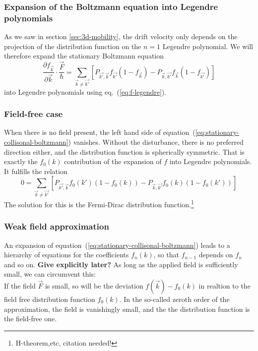 \documentclass[physics,phd,nolot,nolof]{uccthesis}%
\newcommand{\alert}[1]{\textbf{\color{red}#1}}
\begin{document}
{\subsubsection{Expansion of the Boltzmann equation into Legendre polynomials}
As we saw in section \ref{sec:3d-mobility}, the drift velocity only depends on 
the projection of the distribution function on the $n=1$ Legendre polynomial.
We will therefore expand the stationary Boltzmann equation
\begin{equation}
  \frac{\partial f_{\vec k}}{\partial \vec k} \cdot \frac{\vec F}{\hbar}
  =\sum\limits_{\vec{k}\neq\vec{k'}}
  \left[P_{\vec{ k'},\vec{k}}f_{\vec{k'}}(1-f_{\vec{k}})-P_{\vec k,\vec{k'}}f_{\vec k}(1-f_{\vec{k'}})\right]
  \label{eq:stationary-collisonal-boltzmann}
\end{equation}
into Legendre polynomials using eq.~(\ref{eq:f-legendre}).
\subsubsection{Field-free case}
When there is no field present, the left hand side of equation~(\ref{eq:stationary-collisonal-boltzmann}) vanishes. 
Without the disturbance, there is no preferred direction either, and
the distribution function is spherically symmetric.
That is exactly the $f_0(k)$ contribution of the expansion of $f$ into
Legendre polynomials. 
It fulfills the relation
\begin{equation}
  0=\sum\limits_{\vec{k}\neq\vec{k'}}
  \left[P_{\vec{ k'},\vec{k}}
  f_0(k')(1-f_0(k))-
  P_{\vec k,\vec{k'}}
  f_0( k)(1-f_0(k'))\right]
  \label{eq:equilibrium-boltzmann}
\end{equation}
The solution for this is the Fermi-Dirac distribution function.\footnote{H-theorem,etc, citation needed!}

\subsubsection{Weak field approximation}
An expansion of equation~(\ref{eq:stationary-collisonal-boltzmann})
leads to a hierarchy of equations for the coefficients $f_n(k)$,
so that $f_{n-1}$ depends on $f_n$ and so on.
\alert{Give explicitly later?}
As long as the applied field is sufficiently small, we can circumvent this:\\
If the field $\vec F$ is small, so will be the deviation $f(\vec k) -f_0(k)$ in realtion to the field free distribution function $f_0(k)$. 
In the so-called zeroth order of the approximation, the field is vanishingly small, and the the distribution function is the field-free one.

}
\end{document}
